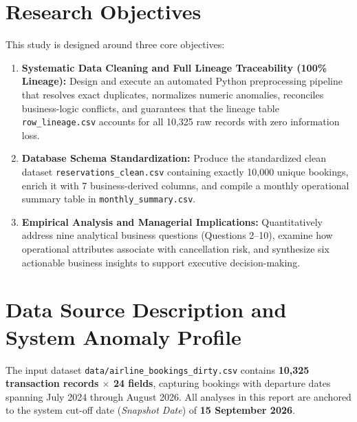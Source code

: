 \documentclass[12pt, a4paper]{report}
\newcommand{\code}[1]{\texttt{\small\color{DarkSlate}#1}}
\begin{document}
\section{Research Objectives}

This study is designed around three core objectives:

\begin{enumerate}
  \item \textbf{Systematic Data Cleaning and Full Lineage Traceability (100\% Lineage):} Design and execute an automated Python preprocessing pipeline that resolves exact duplicates, normalizes numeric anomalies, reconciles business-logic conflicts, and guarantees that the lineage table \code{row\_lineage.csv} accounts for all 10,325 raw records with zero information loss.

  \item \textbf{Database Schema Standardization:} Produce the standardized clean dataset \code{reservations\_clean.csv} containing exactly 10,000 unique bookings, enrich it with 7 business-derived columns, and compile a monthly operational summary table in \code{monthly\_summary.csv}.

  \item \textbf{Empirical Analysis and Managerial Implications:} Quantitatively address nine analytical business questions (Questions 2--10), examine how operational attributes associate with cancellation risk, and synthesize six actionable business insights to support executive decision-making.
\end{enumerate}

\section{Data Source Description and System Anomaly Profile}

The input dataset \code{data/airline\_bookings\_dirty.csv} contains \textbf{10,325 transaction records $\times$ 24 fields}, capturing bookings with departure dates spanning July 2024 through August 2026. All analyses in this report are anchored to the system cut-off date (\textit{Snapshot Date}) of \textbf{15 September 2026}.
\end{document}
